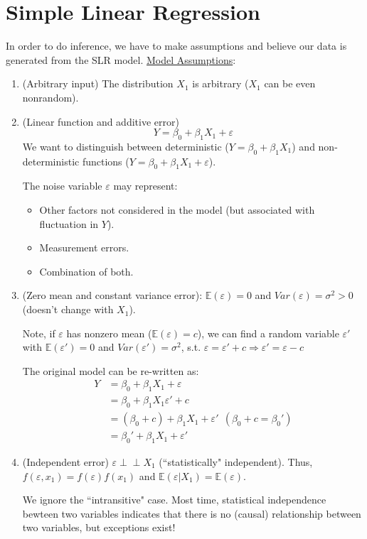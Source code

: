 \documentclass{article}
\newcommand{\indep}{\perp \!\!\! \perp}
\newcommand{\E}{\mathbb{E}}
\begin{document}
\section{Simple Linear Regression}
In order to do inference, we have to make assumptions and believe our data is generated from the SLR model.
\bigbreak\noindent\underline{Model Assumptions}:
\begin{enumerate}
    \item (Arbitrary input) The distribution $X_1$ is arbitrary ($X_1$ can be even nonrandom).
    \item (Linear function and additive error)
    \[Y = \beta_0 + \beta_1X_1 + \varepsilon\]
    We want to distinguish between deterministic ($Y = \beta_0 + \beta_1X_1$) and non-deterministic functions ($Y = \beta_0 + \beta_1X_1 + \varepsilon$).
    
    The noise variable $\varepsilon$ may represent:
    \begin{itemize}
        \item Other factors not considered in the model (but associated with fluctuation in $Y$).
        \item Measurement errors.
        \item Combination of both.
    \end{itemize}
    \item (Zero mean and constant variance error): $\E(\varepsilon) = 0$ and $Var(\varepsilon) = \sigma^2 > 0$ (doesn't change with $X_1$).
    
    Note, if $\varepsilon$ has nonzero mean ($\E(\varepsilon) = c$), we can find a random variable $\varepsilon'$ with $\E(\varepsilon') = 0$ and $Var(\varepsilon') = \sigma^2$, s.t. $\varepsilon = \varepsilon' + c \Rightarrow \varepsilon' = \varepsilon - c$
    
    The original model can be re-written as:
    \begin{align}
        Y &= \beta_0 + \beta_1X_1 + \varepsilon\\
        &= \beta_0 + \beta_1X_1 \varepsilon' + c\\
        &= (\beta_0 + c) + \beta_1X_1 + \varepsilon'\ \ (\beta_0 + c = \beta_0')\\
        &= \beta_0' + \beta_1X_1 +  \varepsilon'
    \end{align}
    \item (Independent error) $\varepsilon \indep X_1$ (``statistically" independent). Thus, $f(\varepsilon,x_1) = f(\varepsilon)f(x_1)$ and $\E(\varepsilon|X_1) = \E(\varepsilon)$.
    
    We ignore the ``intransitive" case. Most time, statistical independence bewteen two variables indicates that there is no (causal) relationship between two variables, but exceptions exist!
\end{enumerate}
\end{document}
